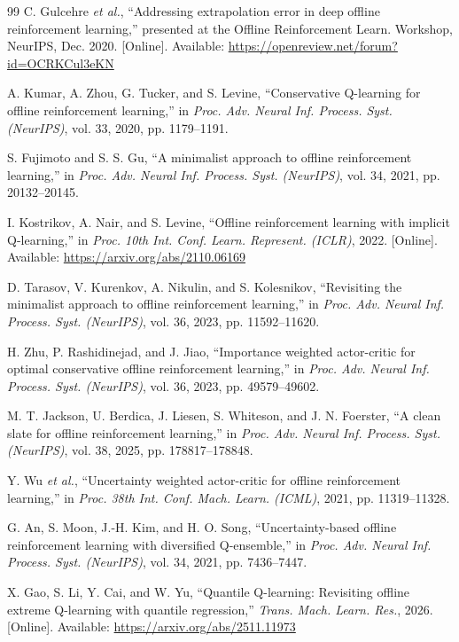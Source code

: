 \documentclass[conference]{IEEEtran}
\begin{document}
\begin{thebibliography}{99}
C. Gulcehre \emph{et al.}, ``Addressing extrapolation error in deep offline reinforcement learning,'' presented at the Offline Reinforcement Learn. Workshop, NeurIPS, Dec. 2020. [Online]. Available: \url{https://openreview.net/forum?id=OCRKCul3eKN}

A. Kumar, A. Zhou, G. Tucker, and S. Levine, ``Conservative Q-learning for offline reinforcement learning,'' in \emph{Proc. Adv. Neural Inf. Process. Syst. (NeurIPS)}, vol. 33, 2020, pp. 1179--1191.

S. Fujimoto and S. S. Gu, ``A minimalist approach to offline reinforcement learning,'' in \emph{Proc. Adv. Neural Inf. Process. Syst. (NeurIPS)}, vol. 34, 2021, pp. 20132--20145.

I. Kostrikov, A. Nair, and S. Levine, ``Offline reinforcement learning with implicit Q-learning,'' in \emph{Proc. 10th Int. Conf. Learn. Represent. (ICLR)}, 2022. [Online]. Available: \url{https://arxiv.org/abs/2110.06169}

D. Tarasov, V. Kurenkov, A. Nikulin, and S. Kolesnikov, ``Revisiting the minimalist approach to offline reinforcement learning,'' in \emph{Proc. Adv. Neural Inf. Process. Syst. (NeurIPS)}, vol. 36, 2023, pp. 11592--11620.

H. Zhu, P. Rashidinejad, and J. Jiao, ``Importance weighted actor-critic for optimal conservative offline reinforcement learning,'' in \emph{Proc. Adv. Neural Inf. Process. Syst. (NeurIPS)}, vol. 36, 2023, pp. 49579--49602.

M. T. Jackson, U. Berdica, J. Liesen, S. Whiteson, and J. N. Foerster, ``A clean slate for offline reinforcement learning,'' in \emph{Proc. Adv. Neural Inf. Process. Syst. (NeurIPS)}, vol. 38, 2025, pp. 178817--178848.

Y. Wu \emph{et al.}, ``Uncertainty weighted actor-critic for offline reinforcement learning,'' in \emph{Proc. 38th Int. Conf. Mach. Learn. (ICML)}, 2021, pp. 11319--11328.

G. An, S. Moon, J.-H. Kim, and H. O. Song, ``Uncertainty-based offline reinforcement learning with diversified Q-ensemble,'' in \emph{Proc. Adv. Neural Inf. Process. Syst. (NeurIPS)}, vol. 34, 2021, pp. 7436--7447.

X. Gao, S. Li, Y. Cai, and W. Yu, ``Quantile Q-learning: Revisiting offline extreme Q-learning with quantile regression,'' \emph{Trans. Mach. Learn. Res.}, 2026. [Online]. Available: \url{https://arxiv.org/abs/2511.11973}


\end{thebibliography}
\end{document}
